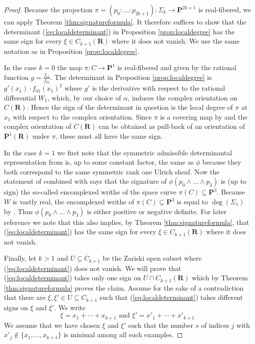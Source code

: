 \documentclass[12pt]{amsart}
\numberwithin{equation}{section}
\numberwithin{thmcounter}{section}
\theoremstyle{definition}
\theoremstyle{claim}
\newcommand{\nR}{\mathbf{R}}
\newcommand{\nP}{\mathbf{P}}
\begin{document}
\begin{proof}
    Because the projection $\pi=(p_0:\dots:p_{2k+1})\colon \Sigma_{k} \longrightarrow \nP^{2k+1}$ is real-fibered, we can apply Theorem \ref{thm:signatureformula}. It therefore suffices to show that the determinant (\ref{eq:localdeterminant}) in Proposition \ref{prop:localdegree} has the same sign for every $\xi\in C_{k+1}(\nR)$ where it does not vanish. We use the same notation as in Proposition \ref{prop:localdegree}.

\medskip

\noindent    In the case $k=0$ the map $\pi\colon C\to\nP^1$ is real-fibered and given by the rational function $g=\frac{f_{11}}{f_{01}}$. The determinant in Proposition \ref{prop:localdegree} is $g'(x_1)\cdot f_{01}(x_1)^2$ where $g'$ is the derivative with respect to the rational differential $W_1$, which, by our choice of $\alpha$, induces the complex orientation on $C(\nR)$. Hence the sign of the determinant in question is the local degree of $\pi$ at $x_1$ with respect to the complex orientation. Since $\pi$ is a covering map by \cite[Theorem 2.19]{kummershamovich} and the complex orientation of $C(\nR)$ can be obtained as pull-back of an orientation of $\nP^1(\nR)$ under $\pi$, these must all have the same sign.

\medskip

\noindent    In the case $k=1$ we first note that the symmetric admissible determinantal representation from \cite[Theorem 6.5]{agostinikummer} is, up to some constant factor, the same as $\phi$ because they both correspond to the same symmetric rank one Ulrich sheaf. Now the statement of \cite[Theorem 6.5]{agostinikummer} combined with \cite[Remark 6.3]{agostinikummer} says that the signature of $\phi(p_0\wedge\dots\wedge p_{3})$ is (up to sign) the so-called encomplexed writhe of the space curve $\pi(C)\subseteq\nP^3$. Because $W$ is vastly real, the encomplexed writhe of $\pi(C)\subseteq\nP^3$ is equal to $\deg(\Sigma_1)$ by \cite[Theorem 2]{mikhalkinorevkov}. Thus $\phi(p_0\wedge\dots\wedge p_{3})$ is either positive or negative definite. For later reference we note that this also implies, by Theorem \ref{thm:signatureformula}, that (\ref{eq:localdeterminant}) has the same sign for every $\xi\in C_{k+1}(\nR)$ where it does not vanish.

\medskip

\noindent    Finally, let $k>1$ and $U\subseteq C_{k+1}$ be the Zariski open subset where (\ref{eq:localdeterminant}) does not vanish. We will prove that (\ref{eq:localdeterminant}) takes only one sign on $U\cap C_{k+1}(\nR)$ which by Theorem \ref{thm:signatureformula} proves the claim. Assume for the sake of a contradiction that there are $\xi,\xi'\in U\subseteq C_{k+1}$ such that (\ref{eq:localdeterminant}) takes different signs on $\xi$ and $\xi'$. We write
    \begin{equation*}
     \xi=x_1+\cdots+x_{k+1}\textrm{ and }\xi'=x'_1+\cdots+x'_{k+1}
    \end{equation*} We assume that we have chosen $\xi$ and $\xi'$ such that the number $s$ of indices $j$ with $x'_j\not\in\{x_1,\ldots,x_{k+1}\}$ is minimal among all such examples.


\end{proof}
\end{document}
